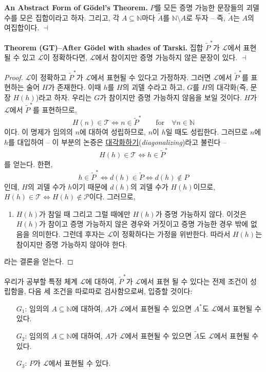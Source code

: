 \documentclass[12pt]{paper}
\newenvironment{context}[1][]
{ \noindent \textbf{{#1}.} }
{ \hfill $ \dashv $ }
\begin{document}
\begin{context}[An Abstract Form of G\"odel's Theorem]
$P$를 모든 증명 가능한 문장들의 괴델 수를 모은 집합이라고 하자.
그리고, 각 $A \subseteq \mathbb{N}$마다 $\widetilde{A}$를 $\mathbb{N} \setminus A$로 두자 --
즉, $\widetilde{A}$는 $A$의 여집합이다.
\end{context}

\begin{context}[Theorem (GT)--After G\"odel with shades of Tarski]
집합 $\widetilde{P}^{*}$가 $\mathcal{L}$에서 표현될 수 있고 $\mathcal{L}$이 정확하다면,
$\mathcal{L}$에서 참이지만 증명 가능하지 않은 문장이 있다.
\end{context}

\begin{proof}
$\mathcal{L}$이 정확하고 $\widetilde{P}^{*}$가 $\mathcal{L}$에서 표현될 수 있다고 가정하자.
그러면 $\mathcal{L}$에서 $\widetilde{P}^{*}$를 표현하는 술어 $H$가 존재한다.
이때 $h$를 $H$의 괴델 수라고 하고,
$G$를 $H$의 대각화(즉, 문장 $ H \left( h \right) $)라고 하자.
우리는 $G$가 참이지만 증명 가능하지 않음을 보일 것이다.
$H$가 $\mathcal{L}$에서 $\widetilde{P}^{*}$를 표현하므로,
$$ H \left( n \right) \in \mathcal{T} \iff n \in \widetilde{P}^{*} \qquad \mathrm{for} \quad \forall n \in \mathbb{N} $$이다.
이 명제가 임의의 $n$에 대하여 성립하므로,
$n$이 $h$일 때도 성립한다.
그러므로 $n$에 $h$를 대입하여 --
이 부분의 논증은 \underline{대각화하기}(\textit{diagonalizing})라고 불린다 --
$$ H \left( h \right) \in \mathcal{T} \iff h \in \widetilde{P}^{*}$$를 얻는다.
한편, $$h \in \widetilde{P}^{*} \iff d \left( h \right) \in \widetilde{P} \iff d \left( h \right) \notin P$$인데,
$H$의 괴델 수가 $h$이기 때문에 $d \left( h \right)$의 괴델 수가 $H \left( h \right)$이므로,
$ H \left( h \right) \in \mathcal{T} \iff H \left( h \right) \notin \mathcal{P}$이다.
그러므로,
\begin{enumerate}
\item $H \left( h \right)$가 참일 때 그리고 그럴 때에만 $H \left( h \right)$가 증명 가능하지 않다.
이것은 $H \left( h \right)$가 참이고 증명 가능하지 않은 경우와 거짓이고 증명 가능한 경우 밖에 없음을 의미한다.
그런데 후자는 $\mathcal{L}$이 정확하다는 가정을 위반한다.
따라서 $H \left( h \right)$는 참이지만 증명 가능하지 않아야 한다.
\end{enumerate}
라는 결론을 얻는다.
\end{proof}

우리가 공부할 특정 체계 $\mathcal{L}$에 대하여,
$\widetilde{P}^{*}$가 $\mathcal{L}$에서 표현 될 수 있다는 전제 조건이 성립함을,
다음 세 조건을 따로따로 검사함으로써, 입증할 것이다:
\begin{itemize}
\item[$G_1$:] 임의의 $A \subseteq \mathbb{N}$에 대하여, $A$가 $\mathcal{L}$에서 표현될 수 있으면 $A^{*}$도 $\mathcal{L}$에서 표현될 수 있다.
\item[$G_2$:] 임의의 $A \subseteq \mathbb{N}$에 대하여, $A$가 $\mathcal{L}$에서 표현될 수 있으면 $\widetilde{A}$도 $\mathcal{L}$에서 표현될 수 있다.
\item[$G_3$:] $P$가 $\mathcal{L}$에서 표현될 수 있다.
\end{itemize}
\end{document}

